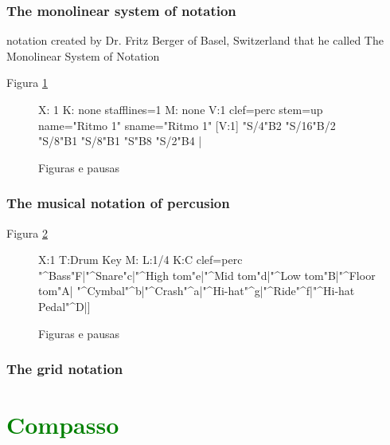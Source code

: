 \subsubsection{The monolinear system of notation}
notation created by Dr. Fritz Berger of Basel, Switzerland that he called The Monolinear System of Notation

Figura \ref{fig:abc-monolinearperc}
\begin{figure}[H]
\centering
\begin{abc}[name=abc-monolinearperc]
%
X: 1 %
K: none stafflines=1 %
M: none %
V:1 clef=perc stem=up name="Ritmo 1"   sname="Ritmo 1"
%
[V:1] "S/4"B2 "S/16"B/2 "S/8"B1 "S/8"B1 "S"B8  "S/2"B4  |

\end{abc}
\caption{Figuras e pausas}
\label{fig:abc-monolinearperc}
\end{figure}


\subsubsection{The musical notation of percusion}
Figura \ref{fig:abc-musicalperc}
\begin{figure}[H]
\centering
\begin{abc}[name=abc-musicalperc]
%
X:1
T:Drum Key
M:
L:1/4
K:C clef=perc
"^Bass"F|"^Snare"c|"^High tom"e|"^Mid tom"d|"^Low tom"B|"^Floor tom"A|
"^Cymbal"^b|"^Crash"^a|"^Hi-hat"^g|"^Ride"^f|"^Hi-hat Pedal"^D|]

\end{abc}
\caption{Figuras e pausas}
\label{fig:abc-musicalperc}
\end{figure}

\subsubsection{The grid notation}

\section{\textcolor{green}{Compasso}}
\label{sec:compaso}

